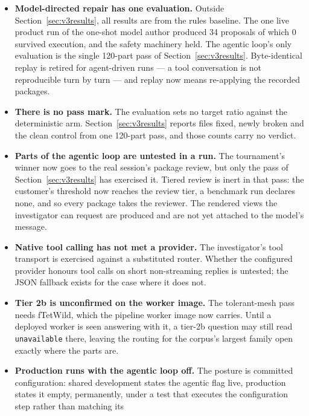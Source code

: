 \documentclass[11pt,onecolumn]{article}
\newcommand{\code}[1]{\texttt{\small #1}}
\begin{document}
\begin{itemize}
  \item \textbf{Model-directed repair has one evaluation.} Outside Section~\ref{sec:v3results},
        all results are from the rules baseline. The one live product run of the one-shot model
        author produced 34 proposals of which 0 survived execution, and the safety machinery held.
        The agentic loop's only evaluation is the single 120-part pass of
        Section~\ref{sec:v3results}. Byte-identical replay is retired for agent-driven runs --- a tool
        conversation is not reproducible turn by turn --- and replay now means re-applying the
        recorded packages.
  \item \textbf{There is no pass mark.} The evaluation sets no target ratio against the
        deterministic arm. Section~\ref{sec:v3results} reports files fixed, newly broken and the
        clean control from one 120-part pass, and those counts carry no verdict.
  \item \textbf{Parts of the agentic loop are untested in a run.} The tournament's winner now
        goes to the real session's package review, but only the pass of
        Section~\ref{sec:v3results} has exercised it. Tiered review is inert in that pass: the
        customer's threshold now reaches the review tier, a benchmark run declares none, and so
        every package takes the reviewer. The rendered views the investigator can request are
        produced and are not yet attached to the model's message.
  \item \textbf{Native tool calling has not met a provider.} The investigator's tool transport is
        exercised against a substituted router. Whether the configured provider honours tool calls
        on short non-streaming replies is untested; the JSON fallback exists for the case where it
        does not.
  \item \textbf{Tier 2b is unconfirmed on the worker image.} The tolerant-mesh pass needs
        fTetWild, which the pipeline worker image now carries. Until a deployed worker is seen
        answering with it, a tier-2b question may still read \code{unavailable} there, leaving the
        routing for the corpus's largest family open exactly where the parts are.
  \item \textbf{Production runs with the agentic loop off.} The posture is committed
        configuration: shared development states the agentic flag live, production states it empty,
        permanently, under a test that executes the configuration step rather than matching its

\end{itemize}
\end{document}
